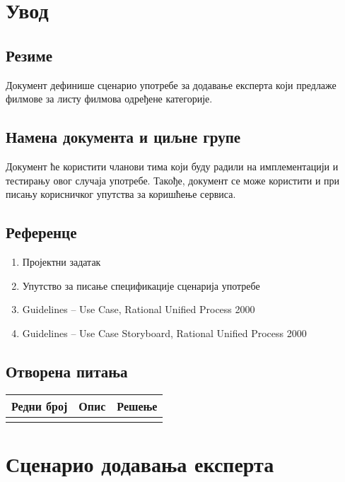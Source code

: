 \section{Увод}

\subsection{Резиме}

Документ дефинише сценарио употребе за додавање експерта који предлаже филмове за листу
филмова одређене категорије.

\subsection{Намена документа и циљне групе}

Документ ће користити чланови тима који буду радили на имплементацији и тестирању овог случаја
употребе. Такође, документ се може користити и при писању корисничког упутства за коришћење
сервиса.

\subsection{Референце}

\begin{enumerate}
    \item Пројектни задатак
    \item Упутство за писање спецификације сценарија употребе
    \item Guidelines – Use Case, Rational Unified Process 2000
    \item Guidelines – Use Case Storyboard, Rational Unified Process 2000
\end{enumerate}

\subsection{Отворена питања}

\noindent
\setcellgapes{4pt}
\makegapedcells
\begin{tabularx}{\linewidth}{|l|X|X|}
    \hline
    \textbf{Редни број} & \textbf{Опис} & \textbf{Решење} \\
    \hline
    & & \\
    \hline
\end{tabularx}

\section{Сценарио додавања експерта}

